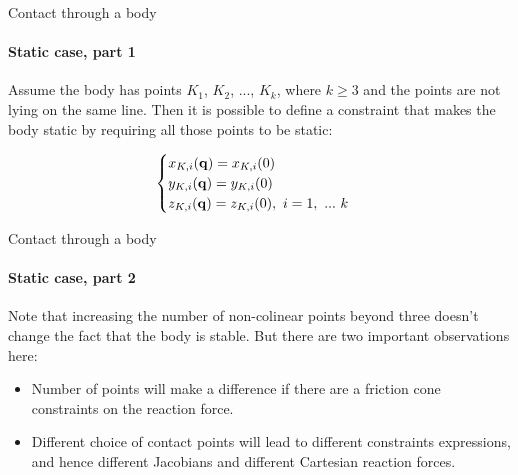 \documentclass{beamer}
\begin{document}
\begin{frame}{Contact through a body}
\framesubtitle{Static case, part 1}
\begin{flushleft}

Assume the body has points $K_1$, $K_2$, ..., $K_k$, where $k \geq 3$ and the points are not lying on the same line. Then it is possible to define a constraint that makes the body static by requiring all those points to be static:

\begin{equation}
    \begin{cases}
    x_{K, i}(\mathbf{q}) = x_{K, i}(0) \\
    y_{K, i}(\mathbf{q}) = y_{K, i}(0) \\
    z_{K, i}(\mathbf{q}) = z_{K, i}(0), \ i = 1, \ ... \ k
    \end{cases}
\end{equation}

\end{flushleft}
\end{frame}



\begin{frame}{Contact through a body}
\framesubtitle{Static case, part 2}
\begin{flushleft}

Note that increasing the number of non-colinear points beyond three doesn't change the fact that the body is stable. But there are two important observations here:

\begin{itemize}
    \item Number of points will make a difference if there are a friction cone constraints on the reaction force.
    \item Different choice of contact points will lead to different constraints expressions, and hence different Jacobians and different Cartesian reaction forces.
\end{itemize}

\end{flushleft}
\end{frame}
\end{document}
